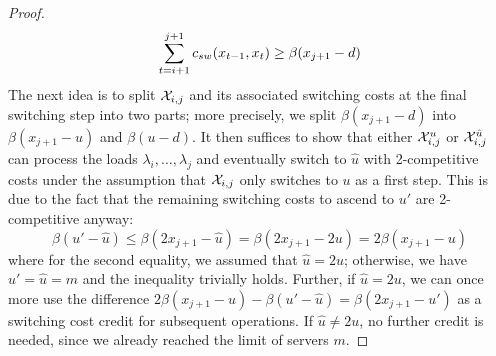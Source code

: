 \begin{proof}
\begin{equation*}
	\sum\limits_{t=i+1}^{j+1}c_{sw}(x_{t-1},x_t)\ge\beta(x_{j+1}-d)
\end{equation*}
The next idea is to split $\mathcal{X}_{i,j}$ and its associated switching costs at the final switching step into two parts; more precisely, we split $\beta(x_{j+1}-d)$ into $\beta(x_{j+1}-u)$ and $\beta(u-d)$. It then suffices to show that either $\mathcal{X}_{i,j}^u$ or $\mathcal{X}_{i,j}^{\hat{u}}$ can process the loads $\lambda_i,\dotsc,\lambda_j$ and eventually switch to $\hat{u}$ with 2-competitive costs under the assumption that $\mathcal{X}_{i,j}$ only switches to $u$ as a first step. This is due to the fact that the remaining switching costs to ascend to $u'$ are 2-competitive anyway:
\begin{equation*}
	\beta(u'-\hat{u})\le\beta(2x_{j+1}-\hat{u})=\beta(2x_{j+1}-2u)=2\beta(x_{j+1}-u)
\end{equation*}
where for the second equality, we assumed that $\hat{u}=2u$; otherwise, we have $u'=\hat{u}=m$ and the inequality trivially holds. Further, if $\hat{u}=2u$, we can once more use the difference $2\beta(x_{j+1}-u)-\beta(u'-\hat{u})=\beta(2x_{j+1}-u')$ as a switching cost credit for subsequent operations. If $\hat{u}\neq2u$, no further credit is needed, since we already reached the limit of servers $m$.


\end{proof}
